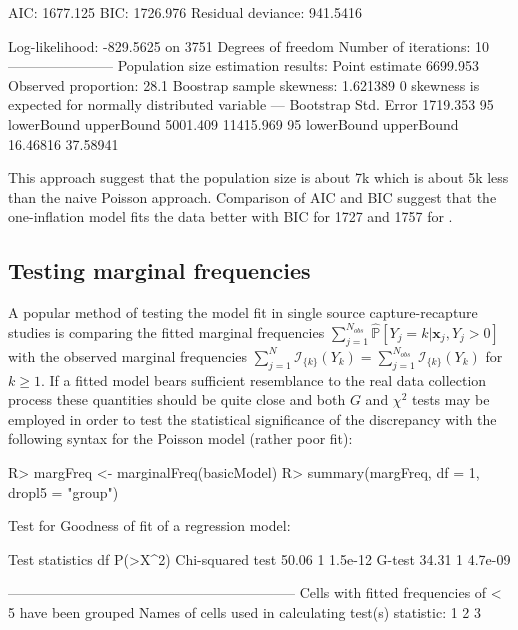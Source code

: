 \documentclass[
]{jss}
\newcommand{\1}{\mathcal{I}} \newcommand{\bZero}{\boldsymbol{0}}
\begin{document}
\begin{CodeChunk}
\begin{CodeOutput}
AIC: 1677.125
BIC: 1726.976
Residual deviance: 941.5416

Log-likelihood: -829.5625 on 3751 Degrees of freedom 
Number of iterations: 10
-----------------------
Population size estimation results: 
Point estimate 6699.953
Observed proportion: 28.1%
Boostrap sample skewness: 1.621389
0 skewness is expected for normally distributed variable
---
Bootstrap Std. Error 1719.353
95%
lowerBound upperBound 
  5001.409  11415.969 
95%
lowerBound upperBound 
  16.46816   37.58941 
\end{CodeOutput}
\end{CodeChunk}

This approach suggest that the population size is about 7k which is
about 5k less than the naive Poisson approach. Comparison of AIC and BIC
suggest that the one-inflation model fits the data better with BIC for
 1727 and 1757 for .

\subsection{Testing marginal
frequencies}\label{testing-marginal-frequencies}

A popular method of testing the model fit in single source
capture-recapture studies is comparing the fitted marginal frequencies
\(\displaystyle\sum_{j=1}^{N_{obs}}\hat{\mathbb{P}}\left[Y_{j}=k|\boldsymbol{x}_{j}, Y_{j} > 0\right]\)
with the observed marginal frequencies
\(\displaystyle\sum_{j=1}^{N}\mathcal{I}_{\{k\}}(Y_{k})=\sum_{j=1}^{N_{obs}}\mathcal{I}_{\{k\}}(Y_{k})\)
for \(k\geq1\). If a fitted model bears sufficient resemblance to the
real data collection process these quantities should be quite close and
both \(G\) and \(\chi^{2}\) tests may be employed in order to test the
statistical significance of the discrepancy with the following
 syntax for the Poisson model (rather poor fit):

\begin{CodeChunk}
\begin{CodeInput}
R> margFreq <- marginalFreq(basicModel)
R> summary(margFreq, df = 1, dropl5 = "group")
\end{CodeInput}
\begin{CodeOutput}
Test for Goodness of fit of a regression model:

                 Test statistics df P(>X^2)
Chi-squared test           50.06  1 1.5e-12
G-test                     34.31  1 4.7e-09

-------------------------------------------------------------- 
Cells with fitted frequencies of < 5 have been grouped 
Names of cells used in calculating test(s) statistic: 1 2 3  
\end{CodeOutput}
\end{CodeChunk}
\end{document}
